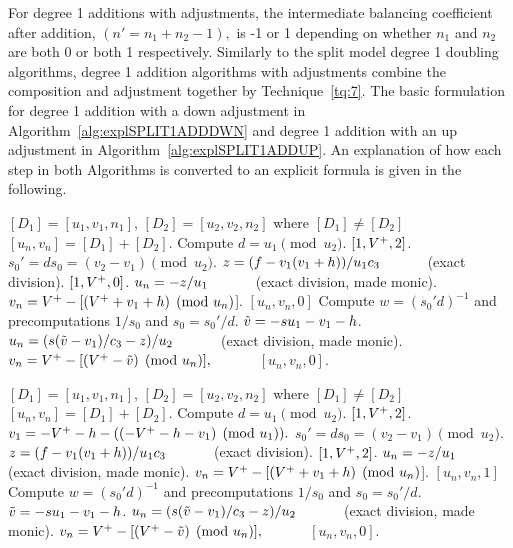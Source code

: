 For degree 1 additions with adjustments, the intermediate balancing coefficient
after addition, $(n' = n_1 + n_2 - 1),$ is -1 or 1 depending on whether $n_1$
and $n_2$ are both 0 or both 1 respectively. Similarly to the split model degree
1 doubling algorithms, degree 1 addition algorithms with adjustments combine the
composition and adjustment together by Technique~\ref{tq:7}. The basic
formulation for degree 1 addition with a down adjustment in
Algorithm~\ref{alg:explSPLIT1ADDDWN} and degree 1 addition with an up adjustment
in Algorithm~\ref{alg:explSPLIT1ADDUP}. An explanation of how each step in both
Algorithms is converted to an explicit formula is given in the following.


\begin{algorithm}[htbp]
\caption{Genus 2 Split Model Degree 1 Addition with Down Adjust\label{alg:explSPLIT1ADDDWN}}
\begin{algorithmic} [1]
\Require $[D_1] = [u_1,v_1,n_1]$, $[D_2] = [u_2,v_2,n_2]$ where $[D_1] \not = [D_2]$ \smallskip
\Ensure $[u_n,v_n] = [D_1] + [D_2] $.
\algrule
\State Compute $d = u_1 \pmod{u_2}$.
    \State \Return $[1,V^{+},2]$.
\EndIf
\State $s_0' = ds_0 = (v_2 - v_1) \pmod{u_2}$.
\State $z = (f - v_1(v_1 +h))/u_1c_3 \quad\quad\quad$ (exact division).
        \State \Return $[1,V^{+},0]$.
    \EndIf
    \State $u_n = -z/u_1 \quad\quad\quad$ (exact division, made monic).
    \State $v_n = V^{+} - [(V^{+} + v_1 + h) \pmod{u_n}$].
    \State \Return $[u_n,v_n,0]$
\EndIf
\State Compute $w = (s_0'd)^{-1}$ and precomputations $1/s_0$ and $s_0 = s_0'/d$.
\State $\tilde{v} = -su_1 - v_1 - h$.
\State $u_n = (s(\tilde{v} - v_1)/c_3 - z)/u_2 \quad\quad\quad$ (exact division, made monic).
\State $v_n = V^{+} - [(V^{+} - \tilde{v}) \pmod{u_n}], \quad\quad\quad$
\State \Return $[u_n,v_n,0]$.
\end{algorithmic}
\end{algorithm}

\begin{algorithm}[htbp]
\caption{Genus 2 Split Model Degree 1 Addition with Up Adjust\label{alg:explSPLIT1ADDUP}}
\begin{algorithmic} [1]
\Require $[D_1] = [u_1,v_1,n_1]$, $[D_2] = [u_2,v_2,n_2]$ where $[D_1] \not = [D_2]$ \smallskip
\Ensure $[u_n,v_n] = [D_1] + [D_2] $.
\algrule
\State Compute $d = u_1 \pmod{u_2}$.
    \State \Return $[1,V^{+},2]$.
\EndIf
\State $v_1 = -V^{+} - h - ((-V^{+} - h - v_1) \pmod{u_1}).$
\State $s_0' = ds_0 = (v_2 - v_1) \pmod{u_2}$.
\State $z = (f - v_1(v_1 +h))/u_1c_3 \quad\quad\quad$ (exact division).
        \State \Return $[1,V^{+},2]$.
    \EndIf
    \State $u_n = -z/u_1 \quad\quad\quad$ (exact division, made monic).
    \State $v_n = V^{+} - [(V^{+} + v_1 + h) \pmod{u_n}$].
    \State \Return $[u_n,v_n,1]$
\EndIf
\State Compute $w = (s_0'd)^{-1}$ and precomputations $1/s_0$ and $s_0 = s_0'/d$.
\State $\tilde{v} = -su_1 - v_1 - h$.
\State $u_n = (s(\tilde{v} - v_1)/c_3 - z)/u_2 \quad\quad\quad$ (exact division, made monic).
\State $v_n = V^{+} - [(V^{+} - \tilde{v}) \pmod{u_n}], \quad\quad\quad$
\State \Return $[u_n,v_n,0]$.
\end{algorithmic}
\end{algorithm}

